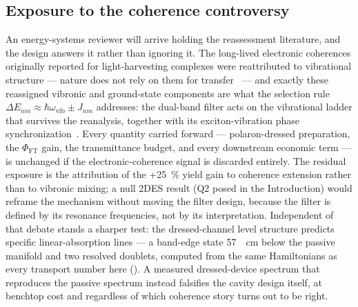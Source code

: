\documentclass[preprint,12pt]{elsarticle}
\begin{document}
\subsection{Exposure to the coherence controversy}
An energy-systems reviewer will arrive holding the reassessment literature, and the design answers it rather than ignoring it. The long-lived electronic coherences originally reported for light-harvesting complexes were reattributed to vibrational structure --- nature does not rely on them for transfer~\cite{Duan2017} --- and exactly these reassigned vibronic and ground-state components are what the selection rule $\Delta E_{nm} \approx \hbar\omega_{\mathrm{vib}} \pm J_{nm}$ addresses: the dual-band filter acts on the vibrational ladder that survives the reanalysis, together with its exciton-vibration phase synchronization~\cite{Zhu2024}. Every quantity carried forward --- polaron-dressed preparation, the $\Phi_{\mathrm{FT}}$ gain, the transmittance budget, and every downstream economic term --- is unchanged if the electronic-coherence signal is discarded entirely. The residual exposure is the attribution of the +\qty{25}{\percent} yield gain to coherence extension rather than to vibronic mixing; a null 2DES result (Q2 posed in the Introduction) would reframe the mechanism without moving the filter design, because the filter is defined by its resonance frequencies, not by its interpretation. Independent of that debate stands a sharper test: the dressed-channel level structure predicts specific linear-absorption lines --- a band-edge state \qty{57}{\per\cm} below the passive manifold and two resolved doublets, computed from the same Hamiltonians as every transport number here (). A measured dressed-device spectrum that reproduces the passive spectrum instead falsifies the cavity design itself, at benchtop cost and regardless of which coherence story turns out to be right.
\end{document}
